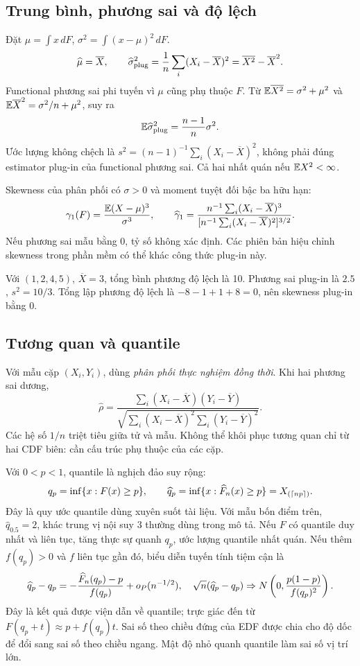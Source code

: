 \subsection{Trung bình, phương sai và độ lệch}
Đặt $\mu=\int x\,dF$, $\sigma^2=\int(x-\mu)^2\,dF$.
\[
\widehat\mu=\overline X,\qquad
\widehat\sigma^2_{\rm plug}=\frac1n\sum_i(X_i-\overline X)^2
=\overline{X^2}-\overline X^2.
\]
Functional phương sai phi tuyến vì $\mu$ cũng phụ thuộc $F$.
Từ $\mathbb E\overline{X^2}=\sigma^2+\mu^2$ và
$\mathbb E\overline X^2=\sigma^2/n+\mu^2$, suy ra
\[
\mathbb E\widehat\sigma^2_{\rm plug}=\frac{n-1}{n}\sigma^2.
\]
Ước lượng không chệch là $s^2=(n-1)^{-1}\sum_i(X_i-\overline X)^2$,
không phải đúng estimator plug-in của functional phương sai.
Cả hai nhất quán nếu $\mathbb E X^2<\infty$.

Skewness của phân phối có $\sigma>0$ và moment tuyệt đối bậc ba hữu hạn:
\[
\gamma_1(F)=\frac{\mathbb E(X-\mu)^3}{\sigma^3},\qquad
\widehat\gamma_1=\frac{n^{-1}\sum_i(X_i-\overline X)^3}
{[n^{-1}\sum_i(X_i-\overline X)^2]^{3/2}}.
\]
Nếu phương sai mẫu bằng 0, tỷ số không xác định. Các phiên bản hiệu chỉnh
skewness trong phần mềm có thể khác công thức plug-in này.
\begin{example}
Với $(1,2,4,5)$, $\overline X=3$, tổng bình phương độ lệch là 10.
Phương sai plug-in là $2.5$, $s^2=10/3$. Tổng lập phương độ lệch là
$-8-1+1+8=0$, nên skewness plug-in bằng 0.
\end{example}

\subsection{Tương quan và quantile}
Với mẫu cặp $(X_i,Y_i)$, dùng \emph{phân phối thực nghiệm đồng thời}.
Khi hai phương sai dương,
\[
\widehat\rho=
\frac{\sum_i(X_i-\overline X)(Y_i-\overline Y)}
{\sqrt{\sum_i(X_i-\overline X)^2\sum_i(Y_i-\overline Y)^2}}.
\]
Các hệ số $1/n$ triệt tiêu giữa tử và mẫu. Không thể khôi phục tương quan
chỉ từ hai CDF biên: cần cấu trúc phụ thuộc của các cặp.

Với $0<p<1$, quantile là nghịch đảo suy rộng:
\[
q_p=\inf\{x:F(x)\geq p\},\qquad
\widehat q_p=\inf\{x:\widehat F_n(x)\geq p\}=X_{(\lceil np\rceil)}.
\]
Đây là quy ước quantile dùng xuyên suốt tài liệu. Với mẫu bốn điểm trên,
$\widehat q_{0.5}=2$, khác trung vị nội suy $3$ thường dùng trong mô tả.
Nếu $F$ có quantile duy nhất và liên tục, tăng thực sự quanh $q_p$,
ước lượng quantile nhất quán. Nếu thêm $f(q_p)>0$ và $f$ liên tục gần đó,
biểu diễn tuyến tính tiệm cận là
\[
\widehat q_p-q_p=
-\frac{\widehat F_n(q_p)-p}{f(q_p)}+o_P(n^{-1/2}),
\quad
\sqrt n(\widehat q_p-q_p)\Rightarrow
N\left(0,\frac{p(1-p)}{f(q_p)^2}\right).
\]
Đây là kết quả được viện dẫn về quantile; trực giác đến từ
$F(q_p+t)\approx p+f(q_p)t$. Sai số theo chiều đứng của EDF được chia
cho độ dốc để đổi sang sai số theo chiều ngang. Mật độ nhỏ quanh quantile
làm sai số vị trí lớn.

